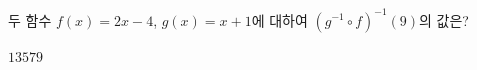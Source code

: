 \hspace*{2mm}\begin{minipage}[t]{\dimexpr\linewidth-2mm\relax}\vspace{0pt}
두 함수 $f(x)=2x-4$, $g(x)=x+1$에 대하여 $(g^{-1}\circ f)^{-1}(9)$의 값은?
\begin{choices32}{$1$}{$3$}{$5$}{$7$}{$9$}\end{choices32}\end{minipage}

